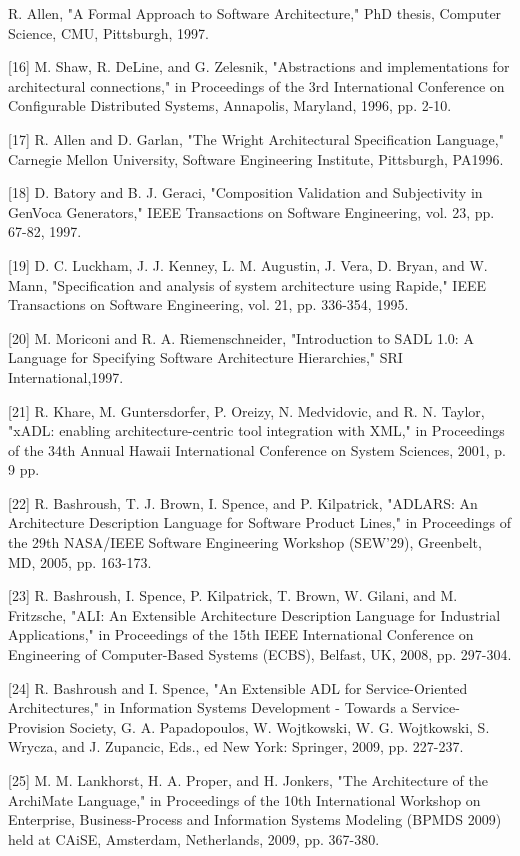 \begin{itemise}
[15]	R. Allen, "A Formal Approach to Software Architecture," PhD thesis, Computer Science, CMU, Pittsburgh, 1997.

[16]	M. Shaw, R. DeLine, and G. Zelesnik, "Abstractions and implementations for architectural connections," in Proceedings of the 3rd International Conference on Configurable Distributed Systems, Annapolis, Maryland, 1996, pp. 2-10.

[17]	R. Allen and D. Garlan, "The Wright Architectural Specification Language," Carnegie Mellon University, Software Engineering Institute, Pittsburgh, PA1996.

[18]	D. Batory and B. J. Geraci, "Composition Validation and Subjectivity in GenVoca Generators," IEEE Transactions on Software Engineering, vol. 23, pp. 67-82, 1997.

[19]	D. C. Luckham, J. J. Kenney, L. M. Augustin, J. Vera, D. Bryan, and W. Mann, "Specification and analysis of system architecture using Rapide," IEEE Transactions on Software Engineering, vol. 21, pp. 336-354, 1995.

[20]	M. Moriconi and R. A. Riemenschneider, "Introduction to SADL 1.0: A Language for Specifying Software Architecture Hierarchies," SRI International,1997.

[21]	R. Khare, M. Guntersdorfer, P. Oreizy, N. Medvidovic, and R. N. Taylor, "xADL: enabling architecture-centric tool integration with XML," in Proceedings of the 34th Annual Hawaii International Conference on System Sciences, 2001, p. 9 pp.

[22]	R. Bashroush, T. J. Brown, I. Spence, and P. Kilpatrick, "ADLARS: An Architecture Description Language for Software Product Lines," in Proceedings of the 29th NASA/IEEE Software Engineering Workshop (SEW'29), Greenbelt, MD, 2005, pp. 163-173.

[23]	R. Bashroush, I. Spence, P. Kilpatrick, T. Brown, W. Gilani, and M. Fritzsche, "ALI: An Extensible Architecture Description Language for Industrial Applications," in Proceedings of the 15th IEEE International Conference on Engineering of Computer-Based Systems (ECBS), Belfast, UK, 2008, pp. 297-304.

[24]	R. Bashroush and I. Spence, "An Extensible ADL for Service-Oriented Architectures," in Information Systems Development - Towards a Service-Provision Society, G. A. Papadopoulos, W. Wojtkowski, W. G. Wojtkowski, S. Wrycza, and J. Zupancic, Eds., ed New York: Springer, 2009, pp. 227-237.

[25]	M. M. Lankhorst, H. A. Proper, and H. Jonkers, "The Architecture of the ArchiMate Language," in Proceedings of the 10th International Workshop on Enterprise, Business-Process and Information Systems Modeling (BPMDS 2009) held at CAiSE, Amsterdam, Netherlands, 2009, pp. 367-380.


\end{itemise}
